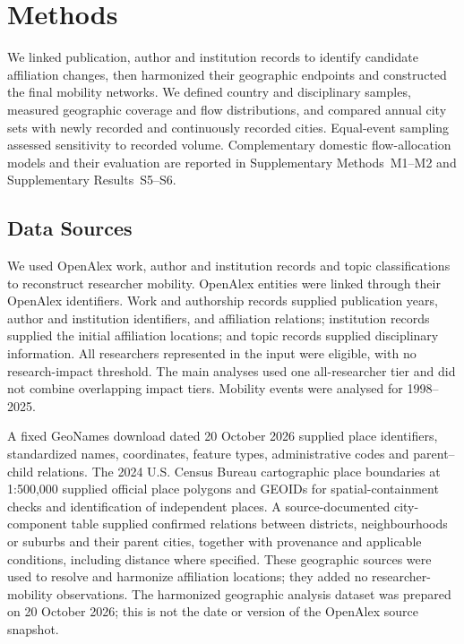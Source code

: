 \section{Methods}

We linked publication, author and institution records to identify candidate affiliation changes, then harmonized their geographic endpoints and constructed the final mobility networks. We defined country and disciplinary samples, measured geographic coverage and flow distributions, and compared annual city sets with newly recorded and continuously recorded cities. Equal-event sampling assessed sensitivity to recorded volume. Complementary domestic flow-allocation models and their evaluation are reported in Supplementary Methods~M1--M2 and Supplementary Results~S5--S6.

\subsection{Data Sources}

We used OpenAlex work, author and institution records and topic classifications\cite{ref021} to reconstruct researcher mobility. OpenAlex entities were linked through their OpenAlex identifiers. Work and authorship records supplied publication years, author and institution identifiers, and affiliation relations; institution records supplied the initial affiliation locations; and topic records supplied disciplinary information. All researchers represented in the input were eligible, with no research-impact threshold. The main analyses used one all-researcher tier and did not combine overlapping impact tiers. Mobility events were analysed for 1998--2025.

A fixed GeoNames download dated 20 October 2026 supplied place identifiers, standardized names, coordinates, feature types, administrative codes and parent--child relations. The 2024 U.S. Census Bureau cartographic place boundaries at 1:500,000 supplied official place polygons and GEOIDs for spatial-containment checks and identification of independent places. A source-documented city-component table supplied confirmed relations between districts, neighbourhoods or suburbs and their parent cities, together with provenance and applicable conditions, including distance where specified. These geographic sources were used to resolve and harmonize affiliation locations; they added no researcher-mobility observations. The harmonized geographic analysis dataset was prepared on 20 October 2026; this is not the date or version of the OpenAlex source snapshot.

